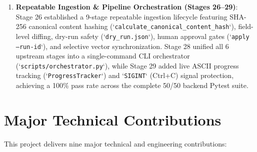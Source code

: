 \begin{enumerate}
    \item \textbf{Repeatable Ingestion \& Pipeline Orchestration (Stages 26--29)}: Stage 26 established a 9-stage repeatable ingestion lifecycle featuring SHA-256 canonical content hashing (`\texttt{calculate\_canonical\_content\_hash}`), field-level diffing, dry-run safety (`\texttt{dry\_run.json}`), human approval gates (`\texttt{apply --run-id}`), and selective vector synchronization. Stage 28 unified all 6 upstream stages into a single-command CLI orchestrator (`\texttt{scripts/orchestrator.py}`), while Stage 29 added live ASCII progress tracking (`\texttt{ProgressTracker}`) and `\texttt{SIGINT}` (Ctrl+C) signal protection, achieving a 100\% pass rate across the complete 50/50 backend Pytest suite.
\end{enumerate}

\section{Major Technical Contributions}
This project delivers nine major technical and engineering contributions:
